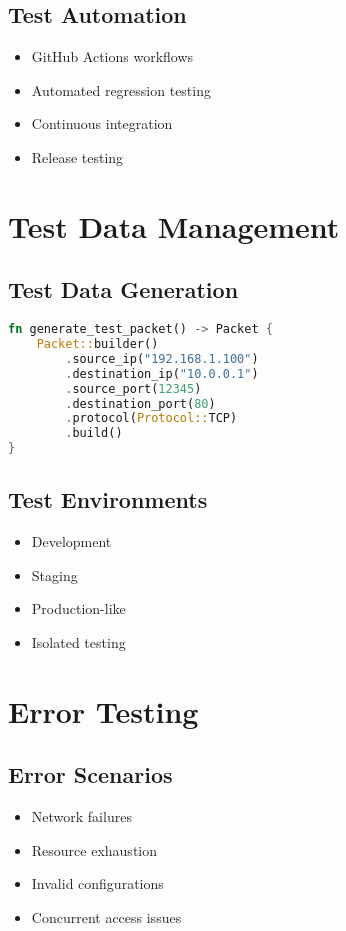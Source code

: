 \documentclass{article}
\begin{document}
\subsection{Test Automation}
\begin{itemize}
    \item GitHub Actions workflows
    \item Automated regression testing
    \item Continuous integration
    \item Release testing
\end{itemize}

\section{Test Data Management}

\subsection{Test Data Generation}
\begin{lstlisting}[language=rust]
fn generate_test_packet() -> Packet {
    Packet::builder()
        .source_ip("192.168.1.100")
        .destination_ip("10.0.0.1")
        .source_port(12345)
        .destination_port(80)
        .protocol(Protocol::TCP)
        .build()
}
\end{lstlisting}

\subsection{Test Environments}
\begin{itemize}
    \item Development
    \item Staging
    \item Production-like
    \item Isolated testing
\end{itemize}

\section{Error Testing}

\subsection{Error Scenarios}
\begin{itemize}
    \item Network failures
    \item Resource exhaustion
    \item Invalid configurations
    \item Concurrent access issues
\end{itemize}
\end{document}
